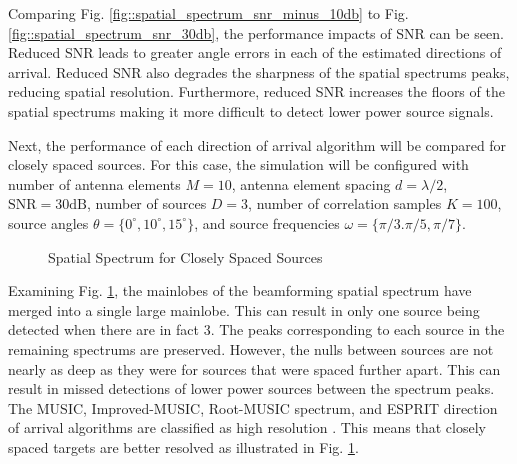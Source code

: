 \documentclass[conference]{IEEEtran}
\begin{document}
		Comparing Fig. \ref{fig::spatial_spectrum_snr_minus_10db} to Fig. \ref{fig::spatial_spectrum_snr_30db}, the performance impacts of SNR can be seen. Reduced SNR leads to greater angle errors in each of the estimated directions of arrival. Reduced SNR also degrades the sharpness of the spatial spectrums peaks, reducing spatial resolution. Furthermore, reduced SNR increases the floors of the spatial spectrums making it more difficult to detect lower power source signals.
		
		Next, the performance of each direction of arrival algorithm will be compared for closely spaced sources. For this case, the simulation will be configured with number of antenna elements $M=10$, antenna element spacing $d=\lambda/2$, $\text{SNR}=30\text{dB}$, number of sources $D=3$, number of correlation samples $K=100$, source angles $\theta = \{0^{\circ}, 10^{\circ}, 15^{\circ}\}$, and source frequencies $\omega = \{\pi/3. \pi/5, \pi/7\}$.
		
		\begin{figure}[H]
			\centerline{}
			\caption{Spatial Spectrum for Closely Spaced Sources}
			\label{fig::closely_spaced_sources}
		\end{figure}
		
		Examining Fig. \ref{fig::closely_spaced_sources}, the mainlobes of the beamforming spatial spectrum have merged into a single large mainlobe. This can result in only one source being detected when there are in fact 3. The peaks corresponding to each source in the remaining spectrums are preserved. However, the nulls between sources are not nearly as deep as they were for sources that were spaced further apart. This can result in missed detections of lower power sources between the spectrum peaks. The MUSIC, Improved-MUSIC, Root-MUSIC spectrum, and ESPRIT direction of arrival algorithms are classified as high resolution \cite{root_music_esprit_patwari}. This means that closely spaced targets are better resolved as illustrated in Fig. \ref{fig::closely_spaced_sources}.
		
\end{document}
